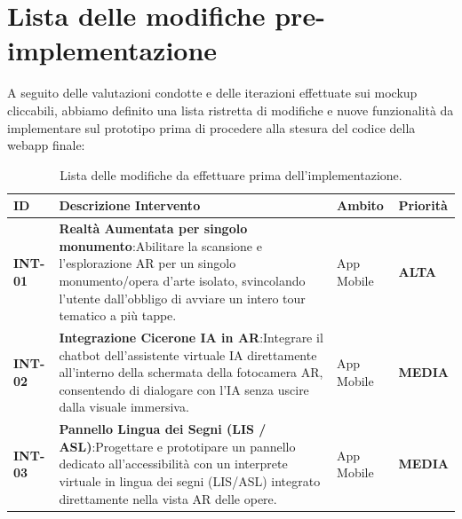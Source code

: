 \section{Lista delle modifiche pre-implementazione}

A seguito delle valutazioni condotte e delle iterazioni effettuate sui mockup cliccabili, abbiamo definito una lista ristretta di modifiche e nuove funzionalità da implementare sul prototipo prima di procedere alla stesura del codice della webapp finale:

\begin{table}[H]
    \centering
    \small
    \renewcommand{\arraystretch}{1.3}
    \begin{tabular}{
        p{1.5cm}
        |>{\raggedright\arraybackslash}p{6.8cm}
        |>{\centering\arraybackslash}p{2.1cm}
        |>{\centering\arraybackslash}p{2.1cm}
    }
    \toprule
    \rowcolor{culturiaRed}
    \textcolor{culturiaWhite}{\textbf{ID}} &
    \textcolor{culturiaWhite}{\textbf{Descrizione Intervento}} &
    \textcolor{culturiaWhite}{\textbf{Ambito}} &
    \textcolor{culturiaWhite}{\textbf{Priorità}} \\
    \midrule
    \rowcolor{culturiaBeige}
    \textbf{INT-01} & \textbf{Realtà Aumentata per singolo monumento}:\newline Abilitare la scansione e l'esplorazione AR per un singolo monumento/opera d'arte isolato, svincolando l'utente dall'obbligo di avviare un intero tour tematico a più tappe. & App Mobile & \textbf{ALTA} \\
    
    \textbf{INT-02} & \textbf{Integrazione Cicerone IA in AR}:\newline Integrare il chatbot dell'assistente virtuale IA direttamente all'interno della schermata della fotocamera AR, consentendo di dialogare con l'IA senza uscire dalla visuale immersiva. & App Mobile & \textbf{MEDIA} \\
    
    \rowcolor{culturiaBeige}
    \textbf{INT-03} & \textbf{Pannello Lingua dei Segni (LIS / ASL)}:\newline Progettare e prototipare un pannello dedicato all'accessibilità con un interprete virtuale in lingua dei segni (LIS/ASL) integrato direttamente nella vista AR delle opere. & App Mobile & \textbf{MEDIA} \\
    \bottomrule
    \end{tabular}
    \caption{Lista delle modifiche da effettuare prima dell'implementazione.}
    \label{tab:priorita_modifiche}
\end{table}
